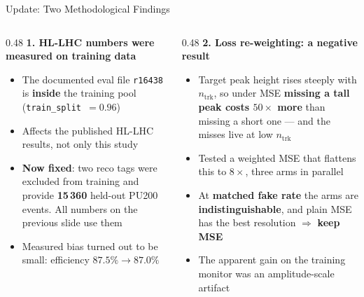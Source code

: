 \documentclass[xcolor=table,aspectratio=169]{beamer}
\newcommand{\ntrk}{\ensuremath{n_\mathrm{trk}}}
\begin{document}
\begin{frame}{Update: Two Methodological Findings}
    \begin{columns}[T]
        \begin{column}{0.48\linewidth}
            \textbf{1. HL-LHC numbers were measured on training data}
            \vspace{0.3em}
            \begin{itemize}\footnotesize\setlength\itemsep{0.25em}
                \item The documented eval file \texttt{r16438} is \textbf{inside}
                      the training pool (\texttt{train\_split}~$=0.96$)
                \item Affects the published HL-LHC results, not only this study
                \item \textbf{Now fixed}: two reco tags were excluded from
                      training and provide \textbf{15\,360} held-out
                      PU200 events. All numbers on the previous slide use them
                \item Measured bias turned out to be small:
                      efficiency $87.5\%\rightarrow87.0\%$
            \end{itemize}
        \end{column}
        \begin{column}{0.48\linewidth}
            \textbf{2. Loss re-weighting: a negative result}
            \vspace{0.3em}
            \begin{itemize}\footnotesize\setlength\itemsep{0.25em}
                \item Target peak height rises steeply with \ntrk, so under MSE
                      \textbf{missing a tall peak costs $50\times$ more} than
                      missing a short one --- and the misses live at low \ntrk
                \item Tested a weighted MSE that flattens this to $8\times$,
                      three arms in parallel
                \item At \textbf{matched fake rate} the arms are
                      \textbf{indistinguishable}, and plain MSE has the best
                      resolution $\Rightarrow$ \textbf{keep MSE}
                \item The apparent gain on the training monitor was an
                      amplitude-scale artifact
            \end{itemize}
        \end{column}
    \end{columns}
\end{frame}
\end{document}
